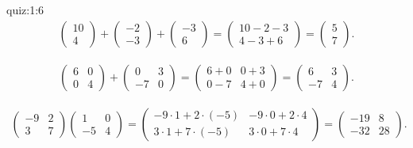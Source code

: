\begin{answerof}{quiz:1:6}
  \begin{align*}
    \begin{pmatrix}
      10\\4
    \end{pmatrix}
    +
    \begin{pmatrix}
      -2\\-3
    \end{pmatrix}
    +
    \begin{pmatrix}
      -3\\6
    \end{pmatrix}
    =
    \begin{pmatrix}
      10-2-3\\4-3+6
    \end{pmatrix}
    =
    \begin{pmatrix}
      5\\7
    \end{pmatrix}.
  \end{align*}

  \begin{align*}
    \begin{pmatrix}
      6&0\\0&4
    \end{pmatrix}+
    \begin{pmatrix}
      0&3\\-7&0
    \end{pmatrix}
    =
    \begin{pmatrix}
      6+0&0+3\\0-7&4+0
    \end{pmatrix}
    =
    \begin{pmatrix}
      6&3\\-7&4
    \end{pmatrix}.
  \end{align*}

  \begin{align*}
    \begin{pmatrix}
      -9&2\\3&7
    \end{pmatrix}
    \begin{pmatrix}
      1&0\\-5&4
    \end{pmatrix}=
    \begin{pmatrix}
     -9\cdot 1+2\cdot (-5)&-9\cdot 0+2\cdot 4\\3\cdot 1+7\cdot (-5)&3\cdot 0 +7\cdot 4
    \end{pmatrix}=
    \begin{pmatrix}
     -19&8\\-32&28
    \end{pmatrix}.
  \end{align*}


\end{answerof}
